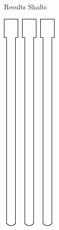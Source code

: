 \documentclass[openany]{book}
\begin{document}
\begin{figure}[!ht]
\begin{subfigure}{.4\textwidth}
		\caption{Results Shafts}
	\end{subfigure}
	\begin{subfigure}{.4\textwidth}
		\centering
    		\includegraphics[width=.05\textwidth]{images/transmission-shaft.pdf}\,
		\includegraphics[width=.05\textwidth]{images/transmission-shaft.pdf}\,
		\includegraphics[width=.05\textwidth]{images/transmission-shaft.pdf}\,

\end{subfigure}
\end{figure}
\end{document}
